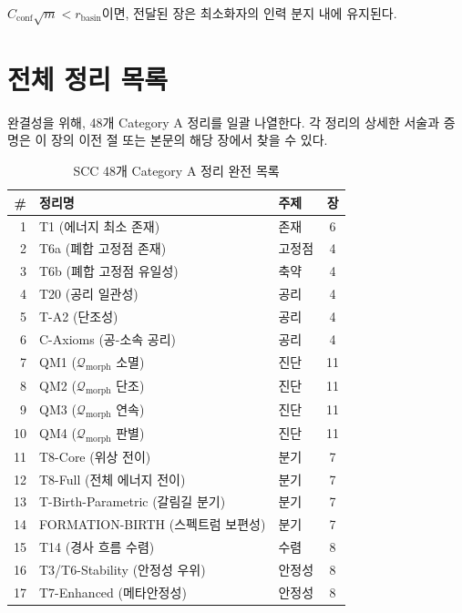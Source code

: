 \begin{theorem}[전달 가두리 한계]
\label{thm:confinement}
$C_{\mathrm{conf}} \sqrt{m} < r_{\mathrm{basin}}$이면, 전달된 장은 최소화자의 인력 분지 내에 유지된다.
\end{theorem}


\section{전체 정리 목록}
\label{sec:full-list}

완결성을 위해, 48개 Category A 정리를 일괄 나열한다. 각 정리의 상세한 서술과 증명은 이 장의 이전 절 또는 본문의 해당 장에서 찾을 수 있다.

\begin{table}[h]
\centering
\caption{SCC 48개 Category A 정리 완전 목록}
\label{tab:all-theorems}
\small
\begin{tabular}{rllc}
\toprule
\textbf{\#} & \textbf{정리명} & \textbf{주제} & \textbf{장} \\
\midrule
1 & T1 (에너지 최소 존재) & 존재 & 6 \\
2 & T6a (폐합 고정점 존재) & 고정점 & 4 \\
3 & T6b (폐합 고정점 유일성) & 축약 & 4 \\
4 & T20 (공리 일관성) & 공리 & 4 \\
5 & T-A2 (단조성) & 공리 & 4 \\
6 & C-Axioms (공-소속 공리) & 공리 & 4 \\
7 & QM1 ($\mathcal{Q}_{\mathrm{morph}}$ 소멸) & 진단 & 11 \\
8 & QM2 ($\mathcal{Q}_{\mathrm{morph}}$ 단조) & 진단 & 11 \\
9 & QM3 ($\mathcal{Q}_{\mathrm{morph}}$ 연속) & 진단 & 11 \\
10 & QM4 ($\mathcal{Q}_{\mathrm{morph}}$ 판별) & 진단 & 11 \\
\midrule
11 & T8-Core (위상 전이) & 분기 & 7 \\
12 & T8-Full (전체 에너지 전이) & 분기 & 7 \\
13 & T-Birth-Parametric (갈림길 분기) & 분기 & 7 \\
14 & FORMATION-BIRTH (스펙트럼 보편성) & 분기 & 7 \\
15 & T14 (경사 흐름 수렴) & 수렴 & 8 \\
16 & T3/T6-Stability (안정성 우위) & 안정성 & 8 \\
17 & T7-Enhanced (메타안정성) & 안정성 & 8 \\

\end{tabular}
\end{table}
